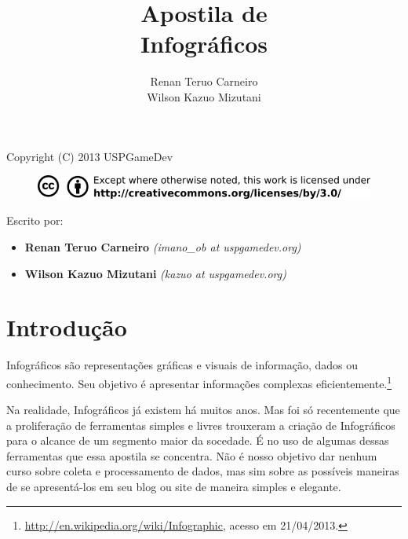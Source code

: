 \documentclass[12pt,onecolumn]{article}
\begin{document}
\begin{titlepage}

    \title{
        \bf
        \LARGE Apostila de \\
        \Huge  Infográficos
    }
    
    \author{Renan Teruo Carneiro \\ Wilson Kazuo Mizutani}
    
    \maketitle
    
    \thispagestyle{empty}
    
\end{titlepage}

\begin{center}
  Copyright (C) 2013 USPGameDev
\end{center}
\begin{figure}[ht]
  \centering
  \includegraphics[width=\textwidth]{CC-BY.png}
\end{figure}

\vspace{300pt}

Escrito por:
\begin{itemize}
  \item \textbf{Renan Teruo Carneiro} \textit{(imano\_ob at uspgamedev.org)}
  \item \textbf{Wilson Kazuo Mizutani} \textit{(kazuo at uspgamedev.org)}
\end{itemize}

\clearpage

\tableofcontents

\clearpage

\section{Introdução}
  Infográficos são representações gráficas e visuais de informação, dados ou
  conhecimento. Seu objetivo é apresentar informações complexas
  eficientemente.\footnote{\url{http://en.wikipedia.org/wiki/Infographic},
  acesso em 21/04/2013.}
  
  Na realidade, Infográficos já existem há muitos anos. Mas foi só recentemente
  que a proliferação de ferramentas simples e livres trouxeram a criação de
  Infográficos para o alcance de um segmento maior da socedade. É no uso de
  algumas dessas ferramentas que essa apostila se concentra. Não é nosso
  objetivo dar nenhum curso sobre coleta e processamento de dados, mas sim sobre
  as possíveis maneiras de se apresentá-los em seu blog ou site de maneira
  simples e elegante.
  
\end{document}
